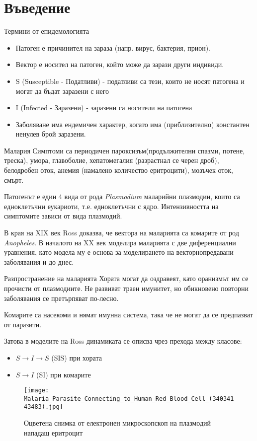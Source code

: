 \section{\hspace{1em}Въведение}
\begin{frame}[t]{Термини от епидемологията}
  \begin{itemize}
    \item Патоген е причинител на зараза (напр. вирус, бактерия, прион).
    \item Вектор е носител на патоген, който може да зарази други индивиди.
    \item S (Susceptible - Податливи) - податливи са тези, които не носят патогена и могат да бъдат заразени с него
    \item I (Infected - Заразени) - заразени са носители на патогена
    \item Заболяване има ендемичен характер, когато има (приблизително) константен ненулев брой заразени.
  \end{itemize}
\end{frame}

\begin{frame}[t]{Малария}
  Симптоми са периодичен пароксизъм(продължителни спазми, потене, треска), умора, главоболие, хепатомегалия (разрастнал се черен дроб), белодробен оток, анемия (намалено количество еритроцити), мозъчек оток, смърт.

  Патогенът е един 4 вида от рода \textit{Plasmodium} маларийни плазмодии, които са едноклетъчни еукариоти, т.е. едноклетъчни с ядро. Интензивността на симптомите зависи от вида плазмодий.

  В края на XIX век Ross доказва, че вектора на маларията са комарите от род \textit{Anopheles}.
  В началото на XX век моделира маларията с две диференциални уравнения, като модела му е основа за моделирането на векторнопредавани заболявания и до днес.
\end{frame}

\begin{frame}[t]{Разпространение на маларията}
  Хората могат да оздравеят, като оранизмът им се прочисти от плазмодиите.
  Не развиват траен имунитет, но обикновено повторни заболявания се претърпяват по-лесно.

  Комарите са насекоми и нямат имунна система, така че не могат да се предпазват от паразити.

  Затова в моделите на Ross динамиката се описва чрез прехода между класове:
  \begin{itemize}
    \item $S \rightarrow I \rightarrow S$ (SIS) при хората
    \item $S \rightarrow I$ (SI) при комарите
  \end{itemize}

  \begin{figure}
    \texttt{[image: Malaria\_Parasite\_Connecting\_to\_Human\_Red\_Blood\_Cell\_(34034143483).jpg]}
    \centering
    \caption{Оцветена снимка от електронен микроскопскоп на плазмодий нападащ еритроцит}
  \end{figure}
\end{frame}
